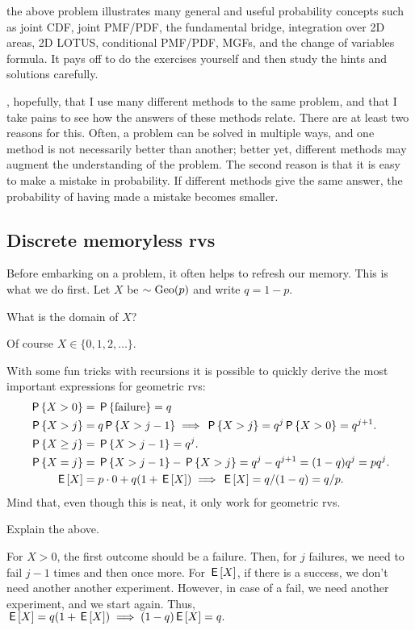  the above problem illustrates many general and useful probability concepts such as  joint CDF, joint PMF/PDF, the fundamental bridge, integration over 2D areas, 2D LOTUS, conditional PMF/PDF, MGFs, and the change of variables formula. It pays off to do the exercises yourself and then study the hints and solutions carefully.

, hopefully, that I use many different methods to the same problem, and that I take pains to see how the answers of these methods relate. There are at least two reasons for this. Often, a problem can be solved in multiple ways, and one method is not necessarily better than another; better yet,  different methods may augment the understanding of the problem. The second reason is that it is easy to make a mistake in probability. If  different methods give the same answer, the probability of having made a mistake becomes smaller.

\subsection{Discrete memoryless rvs} \label{sec:set-1}

Before  embarking on a problem, it often helps to  refresh our memory. This is what we do first.
Let $X$ be $\sim \mathrm{Geo}(p)$ and write $q = 1-p$.

\begin{exercise}
What is the domain of $X$?
\begin{solution}
Of course $X \in \{0, 1, 2, \ldots\}$.
\end{solution}
\end{exercise}

With some fun tricks with recursions it is possible to quickly derive the most important expressions for geometric rvs:
\begin{align*}
\,\mathsf{P}\left\{X>0\right\} &= \,\mathsf{P}\left\{\textrm{failure}\right\} = q\\
\,\mathsf{P}\left\{X>j\right\} &= q \,\mathsf{P}\left\{X>j-1\right\} \implies \,\mathsf{P}\left\{X>j\right\}=q^{j}\,\mathsf{P}\left\{X>0\right\} = q^{j+1}.\\
\,\mathsf{P}\left\{X\geq j\right\} &=  \,\mathsf{P}\left\{X>j-1\right\} = q^{j}.\\
\,\mathsf{P}\left\{X=j\right\} &= \,\mathsf{P}\left\{X>j-1\right\} - \,\mathsf{P}\left\{X>j\right\} = q^{j}-q^{j+1} = (1-q)q^{j} = p q^{j}.\\
\,\mathsf{E}\left[X\right] &= p\cdot 0 + q(1+\,\mathsf{E}\left[X\right]) \implies \,\mathsf{E}\left[X\right] = q/(1-q) = q/p.
\end{align*}
Mind that, even though this is neat, it only work for geometric rvs.

\begin{exercise}
Explain the above.
\begin{solution}
For $X>0$, the first outcome should be a failure. Then, for $j$ failures, we need to fail $j-1$ times and then once more. For $\,\mathsf{E}\left[X\right]$, if there is a success, we don't need another another experiment. However, in case of a fail, we need another experiment, and we start again. Thus, $\,\mathsf{E}\left[X\right] = q(1+\,\mathsf{E}\left[X\right]) \implies (1-q)\,\mathsf{E}\left[X\right] = q.$
\end{solution}
\end{exercise}

